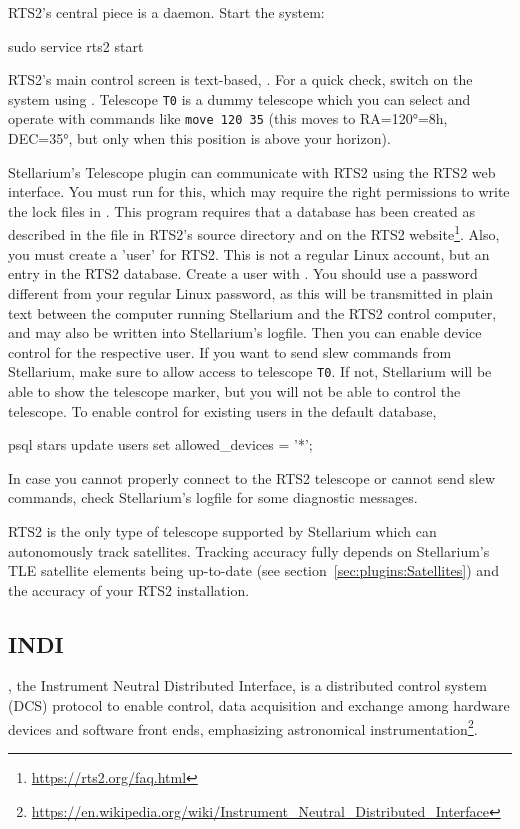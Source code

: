 RTS2's central piece is a daemon. Start the system:
\begin{commands}
sudo service rts2 start
\end{commands}
RTS2's main control screen is text-based, . For a quick check, switch on the system using . 
Telescope \texttt{T0} is a dummy telescope which you can select and operate with commands like \texttt{move 120 35} 
(this moves to RA=120°=8h, DEC=35°, but only when this position is above your horizon).

Stellarium's Telescope plugin can communicate with RTS2 using the RTS2 web interface. You must run  for this, 
which may require the right permissions to write the lock files in . This program requires 
that a database has been created as described in the file  in RTS2's source directory and on the RTS2 website\footnote{\url{https://rts2.org/faq.html}}.   
Also, you must create a 'user' for RTS2. This is not a regular Linux account, but an entry in the RTS2 database. 
Create a user with . You should use a password different from your regular Linux password, 
as this will be transmitted in plain text between the computer running Stellarium and the RTS2 control computer, 
and may also be written into Stellarium's logfile. Then you can enable device control for the respective user. 
If you want to send slew commands from Stellarium, make sure to allow access to telescope \texttt{T0}. 
If not, Stellarium will be able to show the telescope marker, but you will not be able to control the telescope. 
To enable control for existing users in the default  database, 
\begin{commands}
psql stars
update users set allowed_devices = '*';
\end{commands}

In case you cannot properly connect to the RTS2 telescope or cannot send slew commands, 
check Stellarium's logfile  for some diagnostic messages.

RTS2 is the only type of telescope supported by Stellarium which can autonomously track satellites. 
Tracking accuracy fully depends on Stellarium's TLE satellite elements being up-to-date 
(see section~\ref{sec:plugins:Satellites}) and the accuracy of your RTS2 installation.

\subsection{INDI}
\label{sec:plugins:TelescopeControl:INDI}
, the Instrument Neutral Distributed Interface, 
is a distributed control system (DCS) protocol to enable control, data acquisition 
and exchange among hardware devices and software front ends, emphasizing astronomical 
instrumentation\footnote{\url{https://en.wikipedia.org/wiki/Instrument_Neutral_Distributed_Interface}}.
 
